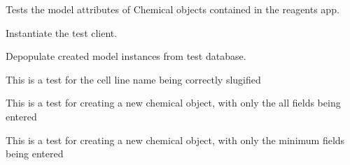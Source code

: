\documentclass[letterpaper,10pt,english]{sphinxmanual}
\begin{document}

\begin{fulllineitems}
\label{api:experimentdb.reagents.tests.ChemicalModelTests}
Tests the model attributes of Chemical objects contained in the reagents app.


\begin{fulllineitems}
\label{api:experimentdb.reagents.tests.ChemicalModelTests.setUp}
Instantiate the test client.


\end{fulllineitems}


\begin{fulllineitems}
\label{api:experimentdb.reagents.tests.ChemicalModelTests.tearDown}
Depopulate created model instances from test database.


\end{fulllineitems}


\begin{fulllineitems}
\label{api:experimentdb.reagents.tests.ChemicalModelTests.test_chemical_slugify}
This is a test for the cell line name being correctly slugified


\end{fulllineitems}


\begin{fulllineitems}
\label{api:experimentdb.reagents.tests.ChemicalModelTests.test_create_chemical_all_fields}
This is a test for creating a new chemical object, with only the all fields being entered


\end{fulllineitems}


\begin{fulllineitems}
\label{api:experimentdb.reagents.tests.ChemicalModelTests.test_create_chemical_minimal}
This is a test for creating a new chemical object, with only the minimum fields being entered


\end{fulllineitems}


\end{fulllineitems}
\end{document}
